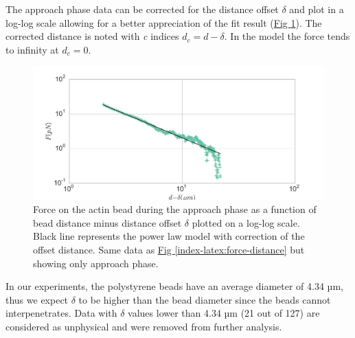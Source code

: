 \documentclass[A4paperpaper,11pt,english]{sphinxmanual}
\begin{document}
The approach phase data can be corrected for the distance offset \(\delta\)
and plot in a log-log scale allowing for a better appreciation of the fit
result (\hyperref[index-latex:force-distance-log-log]{Fig  \ref*{index-latex:force-distance-log-log}}). The corrected distance is noted with  \emph{c} indices \(d_c = d-
\delta\). In the model the force tends to infinity at \(d_c = 0\).
\begin{figure}[htbp]
\centering
\capstart

\includegraphics[width=0.800\linewidth]{force-distance-fit-loglog.pdf}
\caption{Force on the actin bead  during the approach phase as a function of bead distance
minus distance offset \(\delta\) plotted on a log-log scale. Black line
represents the power law model with  correction of the offset distance. Same
data as \hyperref[index-latex:force-distance]{Fig  \ref*{index-latex:force-distance}} but showing only approach phase.}\label{index-latex:force-distance-log-log}\end{figure}

In our experiments, the polystyrene beads have an average diameter of 4.34 µm,
thus we expect \(\delta\) to be higher than the bead diameter since the beads cannot interpenetrates.  Data with
\(\delta\) values lower than 4.34 µm (21 out of 127) are considered as
unphysical and were removed from further analysis.
\end{document}
